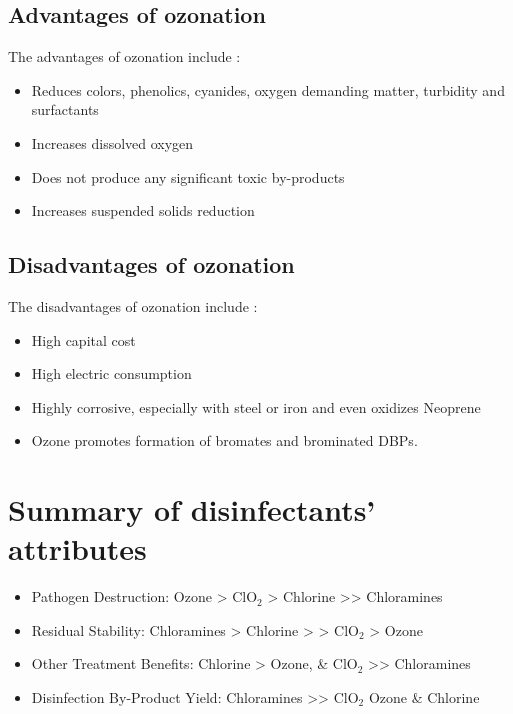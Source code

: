 \subsection{Advantages of ozonation}
	The advantages of ozonation include :
		\begin{itemize}
			\item Reduces colors, phenolics, cyanides, oxygen demanding matter, turbidity and surfactants
			\item Increases dissolved oxygen
			\item Does not produce any significant toxic by-products
			\item Increases suspended solids reduction
		\end{itemize}

\subsection{Disadvantages of ozonation}
	The disadvantages of ozonation include :
		\begin{itemize}
			\item High capital cost
			\item High electric consumption
			\item Highly corrosive, especially with steel or iron and even oxidizes Neoprene
			\item Ozone promotes formation of bromates and brominated DBPs.
		\end{itemize}

\section{Summary of disinfectants' attributes}
\begin{itemize}
\item [\ding{252}] Pathogen Destruction: Ozone > ClO$_2$ > Chlorine >> Chloramines
\item [\ding{252}] Residual Stability: Chloramines > Chlorine > > ClO$_2$ > Ozone
\item [\ding{252}] Other Treatment Benefits: Chlorine > Ozone, \& ClO$_2$ >>  Chloramines
\item [\ding{252}] Disinfection By-Product Yield: Chloramines >> ClO$_2$ Ozone \& Chlorine
\end{itemize}

